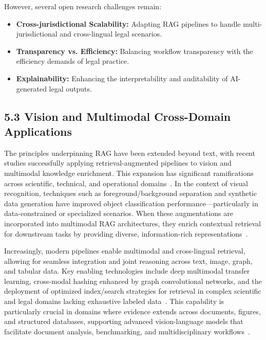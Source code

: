 \documentclass[11pt]{article}
\begin{document}
However, several open research challenges remain:

\begin{itemize}
    \item \textbf{Cross-jurisdictional Scalability:} Adapting RAG pipelines to handle multi-jurisdictional and cross-lingual legal scenarios.
    \item \textbf{Transparency vs. Efficiency:} Balancing workflow transparency with the efficiency demands of legal practice.
    \item \textbf{Explainability:} Enhancing the interpretability and auditability of AI-generated legal outputs.
\end{itemize}

\subsection{5.3 Vision and Multimodal Cross-Domain Applications}

The principles underpinning RAG have been extended beyond text, with recent studies successfully applying retrieval-augmented pipelines to vision and multimodal knowledge enrichment. This expansion has significant ramifications across scientific, technical, and operational domains~\cite{ref3,ref5,ref14,ref15,ref20,ref21,ref23,ref24,ref28,ref29,ref30,ref31,ref33,ref36,ref37,ref38,ref39,ref40,ref43,ref45,ref48,ref52,ref54,ref55,ref61,ref62}. In the context of visual recognition, techniques such as foreground/background separation and synthetic data generation have improved object classification performance—particularly in data-constrained or specialized scenarios. When these augmentations are incorporated into multimodal RAG architectures, they enrich contextual retrieval for downstream tasks by providing diverse, information-rich representations~\cite{ref62}.

Increasingly, modern pipelines enable multimodal and cross-lingual retrieval, allowing for seamless integration and joint reasoning across text, image, graph, and tabular data. Key enabling technologies include deep multimodal transfer learning, cross-modal hashing enhanced by graph convolutional networks, and the deployment of optimized index/search strategies for retrieval in complex scientific and legal domains lacking exhaustive labeled data~\cite{ref14,ref15,ref61,ref62}. This capability is particularly crucial in domains where evidence extends across documents, figures, and structured databases, supporting advanced vision-language models that facilitate document analysis, benchmarking, and multidisciplinary workflows~\cite{ref5,ref14,ref28,ref33,ref36,ref37,ref38,ref39,ref40,ref43,ref45,ref54,ref55}.
\end{document}
